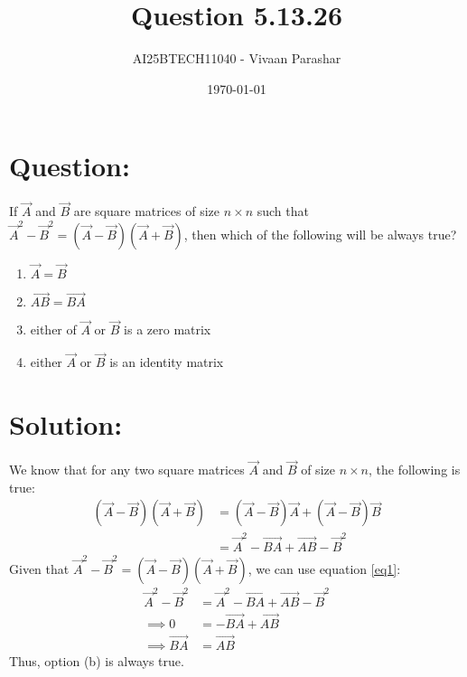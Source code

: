 \documentclass[a4paper, 12pt]{article}
\title{Question 5.13.26}
\author{AI25BTECH11040 - Vivaan Parashar}
\date{\today}
\begin{document}
\maketitle

\section{Question: }
If $\vec{A}$ and $\vec{B}$ are square matrices of size $n \times n$ such that $\vec{A}^2 - \vec{B}^2 = (\vec{A} - \vec{B}) (\vec{A} + \vec{B})$, then which of the following will be always true?
\begin{enumerate}[label=(\alph*)]
    \item $\vec{A} = \vec{B}$
    \item $\vec{AB} = \vec{BA}$
    \item either of $\vec{A}$ or $\vec{B}$ is a zero matrix
    \item either $\vec{A}$ or $\vec{B}$ is an identity matrix
\end{enumerate}

\section{Solution: }
We know that for any two square matrices $\vec{A}$ and $\vec{B}$ of size $n \times n$, the following is true:
\begin{align}
    (\vec{A} - \vec{B}) (\vec{A} + \vec{B}) &= (\vec{A} - \vec{B})\vec{A} + (\vec{A} - \vec{B})\vec{B}\\
    &= \vec{A}^2 - \vec{BA} + \vec{AB} - \vec{B}^2 \label{eq1}
\end{align}
Given that $\vec{A}^2 - \vec{B}^2 = (\vec{A} - \vec{B}) (\vec{A} + \vec{B})$, we can use equation \ref{eq1}:
\begin{align}
    \vec{A}^2 - \vec{B}^2 &= \vec{A}^2 - \vec{BA} + \vec{AB} - \vec{B}^2\\
    \implies 0 &= - \vec{BA} + \vec{AB}\\
    \implies \vec{BA} &= \vec{AB}
\end{align}
Thus, option (b) is always true.
\end{document}
